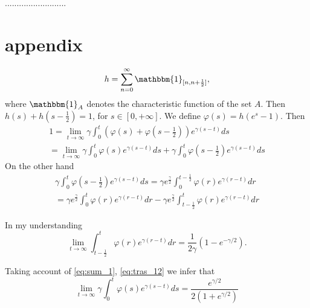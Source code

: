 \documentclass[a4paper,10pt]{article}
\theoremstyle{remark}
\begin{document}
..........................


\section{appendix}\label{sec:apendice}



\[
 h=\sum_{n=0}^{\infty}\mathbbm{1}_{[n,n+\frac12]},
\]
where $\mathbbm{1}_{A}$ denotes the characteristic function of the set $A$.  Then $h(s)+h(s-\frac12)=1$, for $s\in [0,+\infty]$. 
We define $\varphi(s)=h(e^s-1)$. Then
\begin{multline}\label{eq:sum_1}
 1=\lim\limits_{t\to\infty}\gamma\int_0^t \left(\varphi(s)+\varphi\left(s-\frac12\right)
 \right) e^{\gamma (s-t)}ds\\=\lim\limits_{t\to\infty}\gamma\int_0^t\varphi(s)e^{\gamma (s-t)}ds+ \gamma\int_0^t \varphi\left(s-\frac12\right)
  e^{\gamma (s-t)}ds
\end{multline}
On the other hand
\begin{multline}\label{eq:tras_12}
 \gamma\int_0^t \varphi\left(s-\frac12\right)
  e^{\gamma (s-t)}ds= \gamma e^{\frac{\gamma}{2}}\int_0^{t-\frac12} \varphi\left(r\right)
  e^{\gamma (r-t)}dr\\=\gamma e^{\frac{\gamma}{2}}\int_0^{t} \varphi\left(r\right)
  e^{\gamma (r-t)}dr-
  \gamma e^{\frac{\gamma}{2}}\int_{t-\frac12}^{t} \varphi\left(r\right)
  e^{\gamma (r-t)}dr
\end{multline}

In my understanding
\[
\lim\limits_{t\to\infty} \int_{t-\frac12}^{t} \varphi\left(r\right)
  e^{\gamma (r-t)}dr= \frac{1}{2\gamma}(1-e^{-\gamma/2}).
\]

Taking account of \eqref{eq:sum_1}, \eqref{eq:tras_12} we infer that 
\[
\lim\limits_{t\to\infty} \gamma \int_{0}^{t} \varphi\left(s\right)
  e^{\gamma (s-t)}ds=\frac{e^{\gamma/2}}{2(1+e^{\gamma/2})}
\]


  
  
\end{document}
